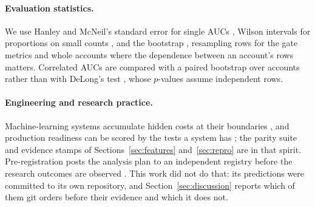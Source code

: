 \paragraph{Evaluation statistics.} We use Hanley and McNeil's standard error for single AUCs
\cite{hanley1982auc}, Wilson intervals for proportions on small counts \cite{wilson1927interval},
and the bootstrap \cite{efron1979bootstrap}, resampling rows for the gate metrics and whole accounts
where the dependence between an account's rows matters. Correlated AUCs are compared with a paired
bootstrap over accounts rather than with DeLong's test \cite{delong1988auc}, whose $p$-values assume
independent rows.

\paragraph{Engineering and research practice.} Machine-learning systems accumulate hidden costs at
their boundaries \cite{sculley2015debt}, and production readiness can be scored by the tests a
system has \cite{breck2017testscore}; the parity suite and evidence stamps of
Sections~\ref{sec:features} and~\ref{sec:repro} are in that spirit. Pre-registration posts the analysis plan to an independent registry before the
research outcomes are observed \cite{nosek2018preregistration}. This work did not do that: its predictions were committed
to its own repository, and Section~\ref{sec:discussion} reports which of them git orders before their
evidence and which it does not.
